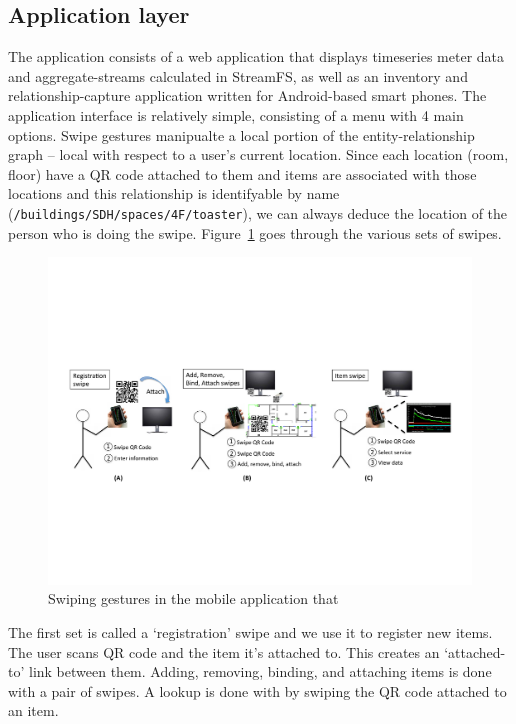 \subsection{Application layer}
The application consists of a web application that displays timeseries meter data and aggregate-streams calculated in StreamFS,
as well as an inventory and relationship-capture application written for Android-based smart phones.
The application interface is relatively simple, consisting of a menu with 4 main options.
Swipe gestures manipualte a local portion of the entity-relationship graph -- local with respect to a user's current location.
Since each location (room, floor) have a QR code attached to them and items are associated with those locations and 
this relationship is identifyable by name ({\tt /buildings/SDH/spaces/4F/toaster}), we can always deduce the location
of the person who is doing the swipe.  Figure~\ref{fig:swipes} goes through the various sets of swipes.


\begin{figure}[htb!]
\begin{center}
\includegraphics[width=\textwidth]{figs/swipes}
\caption{Swiping gestures in the mobile application that }
\label{fig:swipes}
\end{center}
\end{figure}

The first set is called a `registration' swipe and we use it to register new items.  The user scans QR code and the item it's attached
to.  This creates an `attached-to' link between them.  Adding, removing, binding, and attaching items is done with a pair of swipes.
A lookup is done with by swiping the QR code attached to an item.

